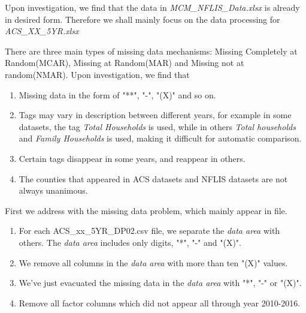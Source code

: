 Upon investigation, we find that the data in \textit{MCM\_NFLIS\_Data.xlsx} is already in desired form. Therefore we shall mainly focus on the data processing for  \textit{ACS\_XX\_5YR.xlsx}

There are three main types of missing data mechanisms: Missing Completely at Random(MCAR), Missing at Random(MAR) and Missing not at random(NMAR). Upon investigation, we find that 

\begin{enumerate}
	\item Missing data in the form of "**", "-", "(X)" and so on.
	\item Tags may vary in description between different years, for example in some datasets, the tag \textit{Total Households} is used, while in others \textit{Total households} and \textit{Family Households} is used, making it difficult for automatic comparison.
	\item Certain tags disappear in some years, and reappear in others. 
	\item The counties that appeared in ACS datasets and NFLIS datasets are not always unanimous.
\end{enumerate}

First we address with the missing data problem, which mainly appear in file.

\begin{enumerate}
	\item For each ACS\_xx\_5YR\_DP02.csv file, we separate the \textit{data area} with others. The \textit{data area} includes only digits, "*", "-" and "(X)". 
	\item We remove all columns in the \textit{data area} with more than ten "(X)" values.
	\item We've just evacuated the missing data in the \textit{data area} with  "*", "-" or "(X)".
	\item Remove all factor columns which did not appear all through year 2010-2016.
\end{enumerate}
